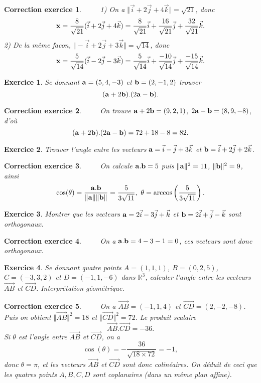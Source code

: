 \documentclass[12pt]{article}
\newtheorem{exercice}{\bf Exercice}
\newtheorem{correction}{\bf Correction exercice}
\newenvironment{exo}{
\begin{exercice}\smallskip\normalfont}{\end{exercice}
}
\newenvironment{cor}{
\begin{correction}\smallskip\normalfont}{\end{correction}
}
\newcommand{\I}{{ \vec{i}}}
\newcommand{\J}{{ \vec{j}}}
\newcommand{\K}{{ \vec{k}}}
\newif\ifcorrige\corrigetrue
\begin{document}
\ifcorrige
\color{magenta}
\begin{cor}
  $\qquad$ 
1)  On a $\Vert \I+2\J+4\K \Vert=\sqrt{21}$, donc 
  $${\bf x}=\frac{8}{\sqrt{21}}(\I+2\J+4\K)= \frac{8}{\sqrt{21}}\I+\frac{16}{\sqrt{21}}\J+\frac{32}{\sqrt{21}}\K.$$
  2) De la m\^eme facon, $\Vert -\I+2\J+3\K \Vert=\sqrt{14}$, donc
  $${\bf x}=\frac{5}{\sqrt{14}}(\I-2\J-3\K)= \frac{5}{\sqrt{14}}\I+\frac{-10}{\sqrt{14}}\J+\frac{-15}{\sqrt{14}}\K.$$
\end{cor}
\color{black}
\fi
\begin{exo}
 Se donnant ${\bf a}=(5,4,-3)$ et ${\bf b}=(2,-1,2)$ trouver
 $$({\bf a}+2{\bf b}).(2{\bf a}-{\bf b}). $$
\end{exo}
\ifcorrige
\color{magenta}
\begin{cor}
  $\qquad$ 
  On trouve ${\bf a}+2{\bf b}=(9,2,1)$, $2{\bf a}-{\bf b}=(8,9,-8)$, d'o\`u
  $$({\bf a}+2{\bf b}).(2{\bf a}-{\bf b})=72+18-8=82. $$
\end{cor}
\color{black}
\fi
\begin{exo}
 Trouver l'angle entre les vecteurs ${\bf a}=\I-\J+3\K$ et ${\bf b}=\I+2\J+2\K$.
\end{exo}
\ifcorrige
\color{magenta}
\begin{cor}
  $\qquad$ 
  On calcule ${\bf a}.{\bf b}=5$ puis $\Vert {\bf a} \Vert^2=11$, $\Vert {\bf b} \Vert^2=9$, ainsi
  $$\cos(\theta)=\frac{{\bf a}.{\bf b} }{\Vert {\bf a} \Vert \Vert {\bf b} \Vert}=\frac{5}{3\sqrt{11}},\ \theta=\arccos\left(\frac{5}{3\sqrt{11}} \right).$$
\end{cor}
\color{black}
\fi
\begin{exo}
 Montrer que les vecteurs ${\bf a}=2\I-3\J+\K$ et ${\bf b}=2\I+\J-\K$ sont orthogonaux.
\end{exo}
\ifcorrige
\color{magenta}
\begin{cor}
  $\qquad$ 
  On a ${\bf a}.{\bf b}=4-3-1=0$, ces vecteurs sont donc orthogonaux.
\end{cor}
\color{black}
\fi
\begin{exo} Se donnant quatre points $A=(1,1,1)$, $B=(0,2,5)$, $C=(-3,3,2)$ et $D=(-1,1,-6)$ dans $\mathbb R^3$, calculer l'angle entre les vecteurs
$\overrightarrow{AB} $ et $\overrightarrow{CD}$. Interpr\'etation g\'eom\'etrique.
\end{exo}
 \ifcorrige
\color{magenta}
\begin{cor}
  $\qquad$ 
  On a $\overrightarrow{AB}=(-1,1,4)$ et $\overrightarrow{CD}=(2,-2,-8)$. Puis on obtient
  $\Vert \overrightarrow{AB} \Vert^2=18$ et $\Vert \overrightarrow{CD} \Vert^2=72$. Le produit scalaire
  $$\overrightarrow{AB}.\overrightarrow{CD}=-36. $$
  Si $\theta$ est l'angle entre $\overrightarrow{AB} $ et $\overrightarrow{CD}$, on a
  $$\cos(\theta)=-\frac{36}{\sqrt{18\times 72}} =-1,$$
  donc $\theta=\pi$, et les vecteurs  $\overrightarrow{AB} $ et $\overrightarrow{CD}$ sont donc colinéaires. On déduit de ceci que les quatres points $A,B,C,D$ sont coplanaires (dans un m\^eme plan affine).
\end{cor}
\color{black}
\fi
\end{document}

